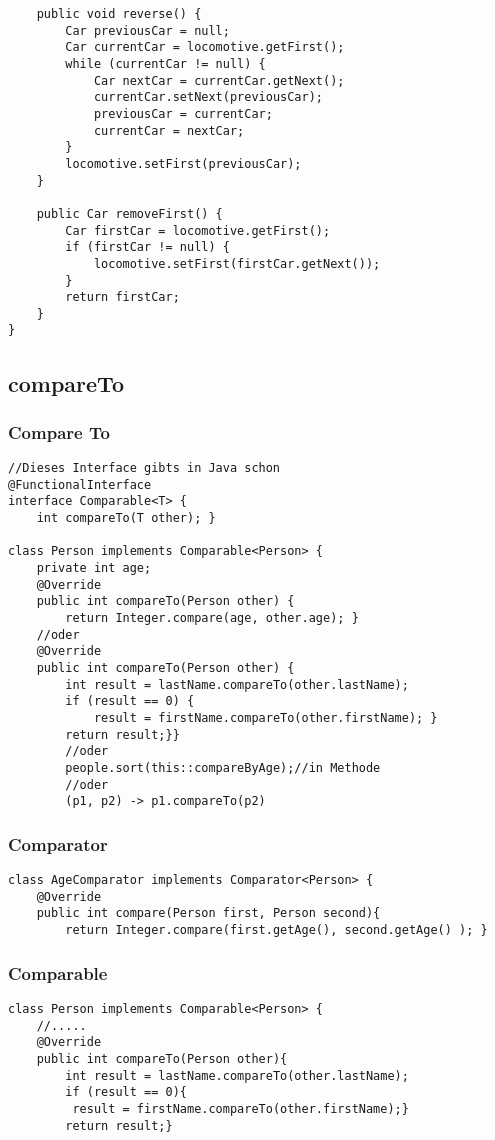 \begin{multicols*}{5}
\begin{lstlisting}
	public void reverse() {
		Car previousCar = null;
		Car currentCar = locomotive.getFirst();
		while (currentCar != null) {
			Car nextCar = currentCar.getNext();
			currentCar.setNext(previousCar);
			previousCar = currentCar;
			currentCar = nextCar;
		}
		locomotive.setFirst(previousCar);
	}
	
	public Car removeFirst() {
		Car firstCar = locomotive.getFirst();
		if (firstCar != null) {
			locomotive.setFirst(firstCar.getNext());
		}
		return firstCar;
	}
}
	\end{lstlisting}
	
	\subsection{compareTo}
	
	\subsubsection{Compare To}
		\begin{lstlisting}
//Dieses Interface gibts in Java schon
@FunctionalInterface
interface Comparable<T> {
	int compareTo(T other); }

class Person implements Comparable<Person> {
	private int age;
	@Override 
	public int compareTo(Person other) {
		return Integer.compare(age, other.age); }
	//oder
	@Override 
	public int compareTo(Person other) {
		int result = lastName.compareTo(other.lastName);
		if (result == 0) {
			result = firstName.compareTo(other.firstName); } 
		return result;}}
		//oder
		people.sort(this::compareByAge);//in Methode
		//oder
		(p1, p2) -> p1.compareTo(p2)
		\end{lstlisting}
	
	
	
	\subsubsection{Comparator}
		\begin{lstlisting}
class AgeComparator implements Comparator<Person> {
	@Override
	public int compare(Person first, Person second){
		return Integer.compare(first.getAge(), second.getAge() ); }
		\end{lstlisting}
	
	\subsubsection{Comparable}
		\begin{lstlisting}
class Person implements Comparable<Person> {
	//.....
	@Override
	public int compareTo(Person other){
		int result = lastName.compareTo(other.lastName);
		if (result == 0){ 
		 result = firstName.compareTo(other.firstName);}
		return result;}
		\end{lstlisting}


\end{multicols*}

